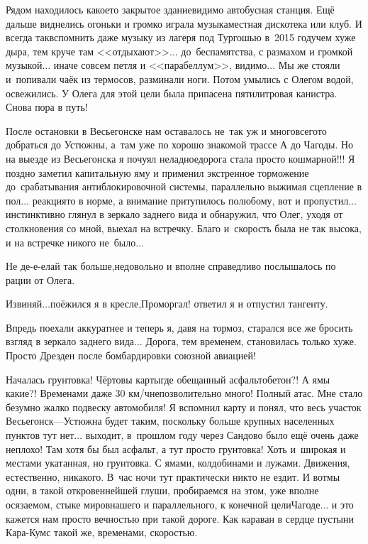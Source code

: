 Рядом находилось какое\sdash то закрытое здание\mdash видимо автобусная станция. Ещё дальше виднелись огоньки и громко играла музыка\mdash местная дискотека или клуб. И всегда так\mdash вспомнить даже музыку из лагеря под Тургошью в~2015 году\mdash чем хуже дыра, тем круче там <<отдыхают>>$\ldots$ до~беспамятства, с размахом и громкой музыкой$\ldots$ иначе совсем петля и <<парабеллум>>, видимо$\ldots$ Мы же стояли и~попивали чаёк из термосов, разминали ноги. Потом умылись с Олегом водой, освежились. У Олега для этой цели была припасена пятилитровая канистра. Снова пора в путь!

После остановки в Весьегонске нам оставалось не~так уж и много\mdash всего\sdash то добраться до Устюжны, а~там уже по хорошо знакомой трассе А до Чагоды. Но на выезде из Весьегонска я почуял неладное\mdash дорога стала просто кошмарной!!! Я поздно заметил капитальную яму и применил экстренное торможение до~срабатывания антиблокировочной системы, параллельно выжимая сцепление в пол$\ldots$ реакция\sdash то в норме, а внимание притупилось по\sdash любому, вот и пропустил$\ldots$ инстинктивно глянул в зеркало заднего вида и обнаружил, что Олег, уходя от столкновения со мной, выехал на встречку. Благо и~скорость была не так высока, и на встречке никого не~было$\ldots$ 

\diagdash Не де-е-елай так больше,\mdash недовольно и вполне справедливо послышалось по рации от Олега. 

\diagdash Извиняй$\ldots$\mdash поёжился я в кресле,\mdash Проморгал! \mdash ответил я и отпустил тангенту.

Впредь поехали аккуратнее и теперь я, давя на тормоз, старался все же бросить взгляд в зеркало заднего вида$\ldots$ Дорога, тем временем, становилась только хуже. Просто Дрезден после бомбардировки союзной авиацией! 

Началась грунтовка! Чёртовы карты\mdash где обещанный асфальтобетон?! А ямы какие?! Временами даже 30 км/ч\mdash непозволительно много! Полный атас. Мне стало безумно жалко подвеску автомобиля! Я вспомнил карту и понял, что весь участок Весьегонск\thinspace\nobreakdash---\thinspace Устюжна будет таким, поскольку больше крупных населенных пунктов тут нет$\ldots$ выходит, в~прошлом году через Сандово было ещё очень даже неплохо! Там хотя бы был асфальт, а тут просто грунтовка! Хоть и~широкая и местами укатанная, но грунтовка. С ямами, колдобинами и лужами. Движения, естественно, никакого. В~час ночи тут практически никто не ездит. И вот\mdash мы одни, в такой откровеннейшей глуши, пробираемся на этом, уже вполне осязаемом, стыке миров\mdash нашего и параллельного, к конечной цели\mdash Чагоде$\ldots$ и это кажется нам просто вечностью при такой дороге. Как караван в сердце пустыни Кара-Кум\mdash с такой же, временами, скоростью.


